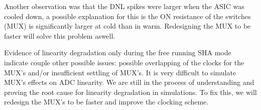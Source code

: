 Another observation was that the DNL spikes were larger when the ASIC was cooled down, a possible explanation for this is the ON resistance of the switches (MUX) is significantly larger at cold than in warm. Redesigning the MUX to be faster will solve this problem aswell.  

Evidence of linearity degradation only during the free running SHA mode indicate couple other possible issues: possible overlapping of the clocks for the MUX's and/or insufficient settling of MUX's. It is very difficult to simulate MUX's effects on ADC linearity. We are still in the process of understanding and proving the root cause for linearity degradation in simulations. To fix this, we will redesign the MUX's to be faster and improve the clocking scheme. 


